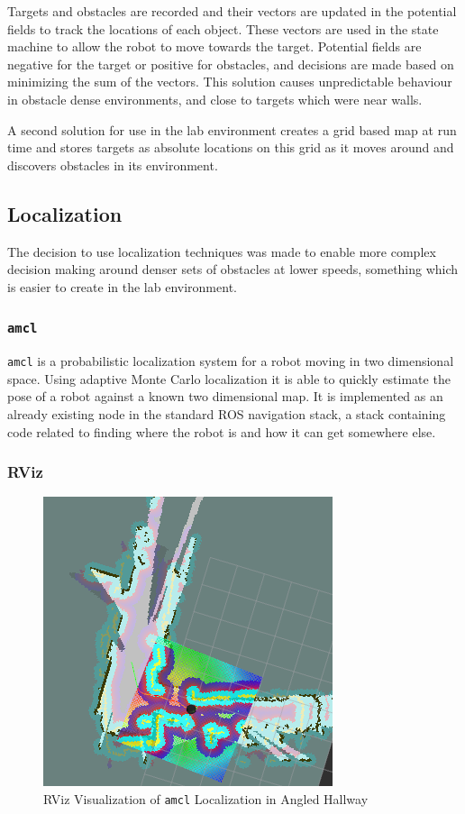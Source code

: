 \documentclass{article}[12]
\begin{document}
	Targets and obstacles are recorded and their vectors are updated in the potential fields to track the locations of each object. These vectors are used in the state machine to allow the robot to move towards the target. Potential fields are negative for the target or positive for obstacles, and decisions are made based on minimizing the sum of the vectors. This solution causes unpredictable behaviour in obstacle dense environments, and close to targets which were near walls.
	
	A second solution for use in the lab environment creates a grid based map at run time and stores targets as absolute locations on this grid as it moves around and discovers obstacles in its environment. 

	\subsection{Localization}
	
	The decision to use localization techniques was made to enable more complex decision making around denser sets of obstacles at lower speeds, something which is easier to create in the lab environment. 
	
	\subsubsection{\texttt{amcl}}
	
	\texttt{amcl} is a probabilistic localization system for a robot moving in two dimensional space. Using adaptive Monte Carlo localization \cite{doucet_freitas_gordon_2001} it is able to quickly estimate the pose of a robot against a known two dimensional map. It is implemented as an already existing node in the standard ROS navigation stack, a stack containing code related to finding where the robot is and how it can get somewhere else.
	
	\subsubsection{RViz}
	
	\begin{figure}[]
		\centering
		\includegraphics[width=0.5\linewidth]{rviz_screenshot}
		\caption{RViz Visualization of \texttt{amcl} Localization in Angled Hallway}
		\label{fig:rviz}
	\end{figure}
	
\end{document}
